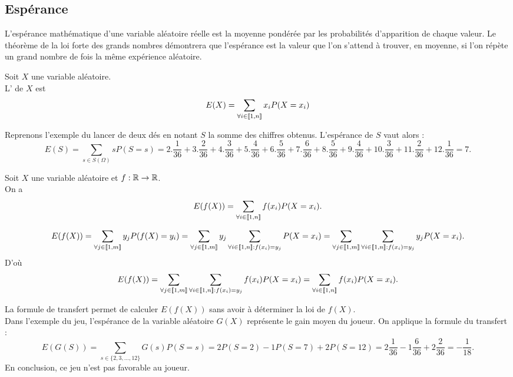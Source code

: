 \documentclass{book}
\begin{document}
\subsection{Espérance}
L'espérance mathématique d'une variable aléatoire réelle est la moyenne pondérée par les probabilités d'apparition de chaque valeur. Le théorème de la loi forte des grands nombres démontrera que l'espérance est la valeur que l'on s'attend à trouver, en moyenne, si l'on répète un grand nombre de fois la même expérience aléatoire.
\begin{Definition}
Soit $X$ une variable aléatoire.\\
L' de $X$ est
\[ E(X) = \sum_{\forall i\in  \mathopen\lbrack\!\lbrack1,n \mathclose\rbrack\!\rbrack } x_i P(X=x_i) \]
\end{Definition} 
\begin{Exemple}
Reprenons l'exemple du lancer de deux dés en notant $S$ la somme des chiffres obtenus. 
L'espérance de $S$ vaut alors :
$$E(S ) = \sum_{s\in S (\Omega)} sP(S = s)=  2.\frac{1}{36}+3.\frac{2}{36}+4.\frac{3}{36}+5.\frac{4}{36}+6.\frac{5}{36}+7.\frac{6}{36}+8.\frac{5}{36}+9.\frac{4}{36}+10.\frac{3}{36}+11.\frac{2}{36}+12.\frac{1}{36}=7.$$
\end{Exemple}


\begin{Theoreme}
Soit $X$ une variable aléatoire et  $f:\mathbb{R}\to \mathbb{R}$.\\
On a
\[ E(f(X)) =  \sum_{\forall i\in  \mathopen\lbrack\!\lbrack1,n \mathclose\rbrack\!\rbrack }  f(x_i) P(X=x_i). \]
\end{Theoreme}
\begin{Demonstration}
$$ E(f(X)) = \sum_{\forall j\in  \Intf{1}{m }}  y_j P(f(X)=y_i)= \sum_{\forall j\in  \Intf{1}{m }}  y_j  \sum_{\forall i\in\Intf{1}{n} :f(x_i)=y_j }P(X=x_i)= \sum_{\forall j\in  \Intf{1}{m }}    \sum_{\forall i\in\Intf{1}{n} :f(x_i)=y_j }y_j P(X=x_i).$$ 
D'où
$$ E(f(X)) = \sum_{\forall j\in  \mathopen\lbrack\!\lbrack1,m  \mathclose\rbrack\!\rbrack}    \sum_{\forall i\in\mathopen\lbrack\!\lbrack1,n \mathclose\rbrack\!\rbrack:f(x_i)=y_j }f(x_i) P(X=x_i)=\sum_{\forall i\in\mathopen\lbrack\!\lbrack1,n \mathclose\rbrack\!\rbrack }f(x_i) P(X=x_i).$$ 
\end{Demonstration}

\begin{Remarque}
La formule de transfert permet de  calculer $E(f(X))$ sans avoir à déterminer la loi de $f(X)$.\\
Dans l'exemple du jeu, l'espérance de la variable aléatoire $G(X)$ représente le gain  moyen du joueur. On applique la formule du transfert :
\[E(G(S))=\sum_{s\in \{2,3,\dots,12\}}  G(s) P(S=s)=2P(S=2)-1P(S=7)+2P(S=12)=2\frac{1}{36}-1\frac{6}{36}+2\frac{2}{36}=-\frac{1}{18}.\]
En conclusion, ce jeu n'est pas favorable au joueur.
\end{Remarque}
\end{document}

